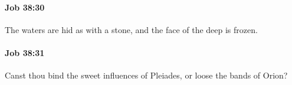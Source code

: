 		\paragraph{Job 38:30} %
			\label{JOB-38-30}

			The waters are hid as with a stone, and the face of the deep is frozen.


		\paragraph{Job 38:31} %
			\label{JOB-38-31}

			Canst thou bind the sweet influences of Pleiades, or loose the bands of Orion?



